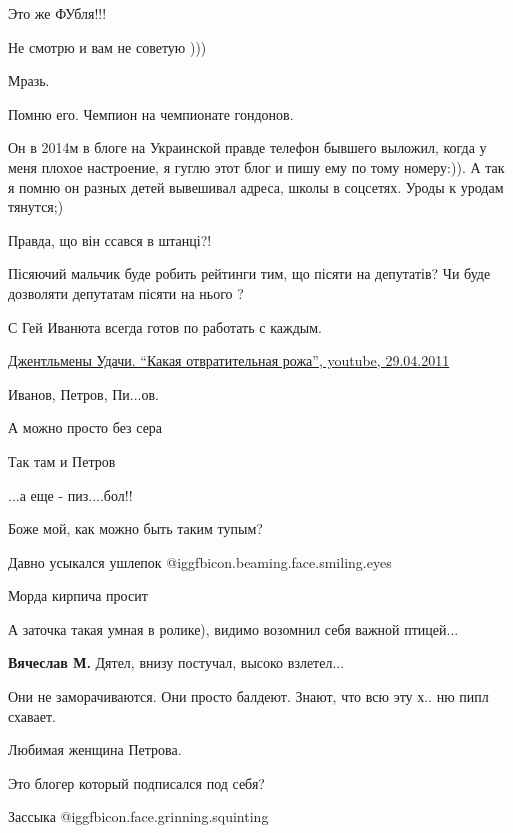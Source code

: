 \begin{itemize}
Это же ФУбля!!!

Не смотрю и вам не советую )))

Мразь.

Помню его. Чемпион на чемпионате гондонов.


Он в 2014м в блоге на Украинской правде телефон бывшего выложил, когда у меня
плохое настроение, я гуглю этот блог и пишу ему по тому номеру:)). А так я помню
он разных детей вывешивал адреса, школы в соцсетях. Уроды к уродам тянутся;)


Правда, що він ссався в штанці?!

Пісяючий мальчик буде робить рейтинги тим, що пісяти на депутатів? Чи буде дозволяти депутатам пісяти на нього ?

С Гей Иванюта всегда готов по работать с каждым.


\href{https://youtu.be/bbuJsHUZe3w}{%
Джентльмены Удачи. \enquote{Какая отвратительная рожа}, youtube, 29.04.2011%
}

Иванов, Петров, Пи...ов.

А можно просто без сера

Так там и Петров

...а еще - пиз....бол!!

Боже мой, как можно быть таким тупым?

Давно усыкался ушлепок @igg{fbicon.beaming.face.smiling.eyes} 

Морда кирпича просит

А заточка такая умная в ролике), видимо возомнил себя важной птицей...

\textbf{Вячеслав М.} Дятел, внизу постучал, высоко взлетел...


Они не заморачиваются. Они просто балдеют. Знают, что всю эту х.. ню пипл схавает.

Любимая женщина Петрова.

Это блогер который подписался под себя?

Зассыка @igg{fbicon.face.grinning.squinting} 


\end{itemize}
